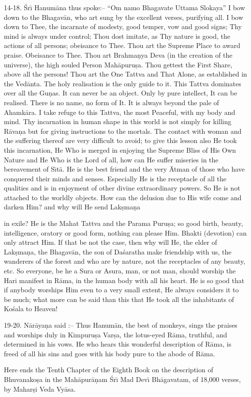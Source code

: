 14-18. \'Sr\={\i} Hanum\=ana thus spoke:-- ``Om namo Bhagavate Uttama Slokaya'' I bow down to the Bhagav\=an, who art sung by the excellent verses, purifying all. I bow down to Thee, the incarnate of modesty, good temper, vow and good signs; Thy mind is always under control; Thou dost imitate, as Thy nature is good, the actions of all persons; obeisance to Thee. Thou art the Supreme Place to award praise. Obeisance to Thee. Thou art Brahma\d{n}ya Deva (in the creation of the universe), the high souled Person Mah\=apuru\d{s}a. Thou gettest the First Share, above all the persons! Thou art the One Tattva and That Alone, as established in the Ved\=anta. The holy realisation is the only guide to it. This Tattva dominates over all the Gu\d{n}as. It can never be an object. Only by pure intellect, It can be realised. There is no name, no form of It. It is always beyond the pale of Ahamk\=ara. I take refuge to this Tattva, the most Peaceful, with my body and mind. Thy incarnation in human shape in this world is not simply for killing R\=ava\d{n}a but for giving instructions to the mortals. The contact with woman and the suffering thereof are very difficult to avoid; to give this lesson also He took this incarnation, He Who is merged in enjoying the Supreme Bliss of His Own Nature and He Who is the Lord of all, how can He suffer miseries in the bereavement of S\={\i}t\=a. He is the best friend and the very \=Atman of those who have conquered their minds and senses. Especially He is the receptacle of all the qualities and is in enjoyment of other divine extraordinary powers. So He is not attached to the worldly objects. How can the delusion due to His wife come and darken Him? and why will He send Lak\d{s}ma\d{n}a

in exile? He is the Mahat Tattva and the Parama Puru\d{s}a; so good birth, beauty, intelligence, oratory or good form, nothing can please Him. Bhakti (devotion) can only attract Him. If that be not the case, then why will He, the elder of Lak\d{s}ma\d{n}a, the Bhagav\=an, the son of Da\'saratha make friendship with us, the wanderers of the forest and who are by nature, not the receptacles of any beauty, etc. So everyone, be he a Sura or Asura, man, or not man, should worship the Hari manifest in R\=ama, in the human body with all his heart. He is so good that if anybody worships Him even to a very small extent, He always considers it to be much; what more can be said than this that He took all the inhabitants of Ko\'sala to Heaven!

19-20. N\=ar\=aya\d{n}a said :-- Thus Hanum\=an, the best of monkeys, sings the praises and worships duly in Kimpuru\d{s}a Var\d{s}a, the lotus-eyed R\=ama, truthful, and determined in his vows. He who hears this wonderful description of R\=ama, is freed of all his sins and goes with his body pure to the abode of R\=ama.

Here ends the Tenth Chapter of the Eighth Book on the description of Bhuvanako\d{s}a in the Mah\=apur\=a\d{n}am \'Sr\={\i} Mad Dev\={\i} Bh\=agavatam, of 18,000 verses, by Mahar\d{s}i Veda Vy\=asa.



